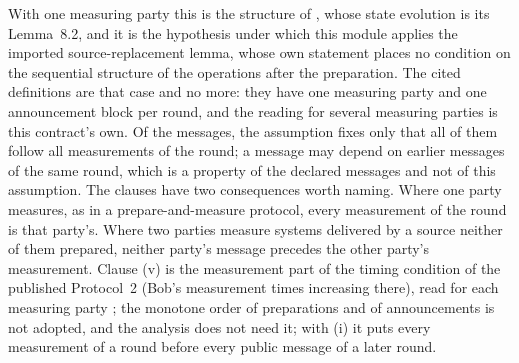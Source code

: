 
With one measuring party this is the structure of
\cite[Def.~8.1, Def.~8.2]{tupkary2026decoy}, whose state evolution is its
Lemma~8.2, and it is the hypothesis under which this module applies the
imported source-replacement lemma, whose own statement places no condition on
the sequential structure of the operations after the preparation. The cited definitions are that case and
no more: they have one measuring party and one announcement block per round,
and the reading for several measuring parties is this contract's own. Of the
messages, the assumption fixes only that all of them follow all measurements
of the round; a message may depend on earlier messages of the same round,
which is a property of the declared messages and not of this assumption. The
clauses have two consequences worth naming. Where one party
measures, as in a prepare-and-measure protocol, every measurement of the round
is that party's. Where two parties measure systems delivered by a source
neither of them prepared, neither party's message precedes the other party's
measurement. Clause (v) is the measurement part of the timing condition of
the published Protocol~2 (Bob's measurement times increasing there), read for
each measuring party \cite[Sec.~8.1.1, Protocol~2]{tupkary2026decoy}; the
monotone order of preparations and of announcements is not adopted, and the
analysis does not need it; with (i) it puts every
measurement of a round before every public message of a later round.

